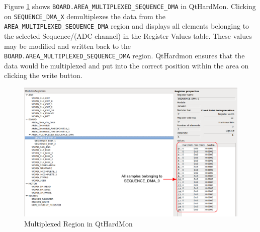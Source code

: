 Figure \ref{mux_qthardmon} shows \texttt{BOARD.AREA\_MULTIPLEXED\_SEQUENCE\_DMA} 
in QtHardMon. Clicking on \texttt{SEQUENCE\_DMA\_X} demultiplexes the data from 
the \\
\texttt{AREA\_MULTIPLEXED\_SEQUENCE\_DMA} region and displays all elements 
belonging to the selected Sequence/(ADC channel) in the Register Values 
table. These values may be modified and written back to the \\
\texttt{BOARD.AREA\_MULTIPLEXED\_SEQUENCE\_DMA} region. QtHardmon ensures that 
the data would be multiplexed and put into the correct position within the area 
on clicking the write button.

\begin{figure}[htbp] 
    \centering
    \includegraphics[width=1\textwidth]{images/MuxAccessorInQtHardMon.pdf} 
\caption{Multiplexed Region in QtHardMon} \label{mux_qthardmon} \end{figure}




